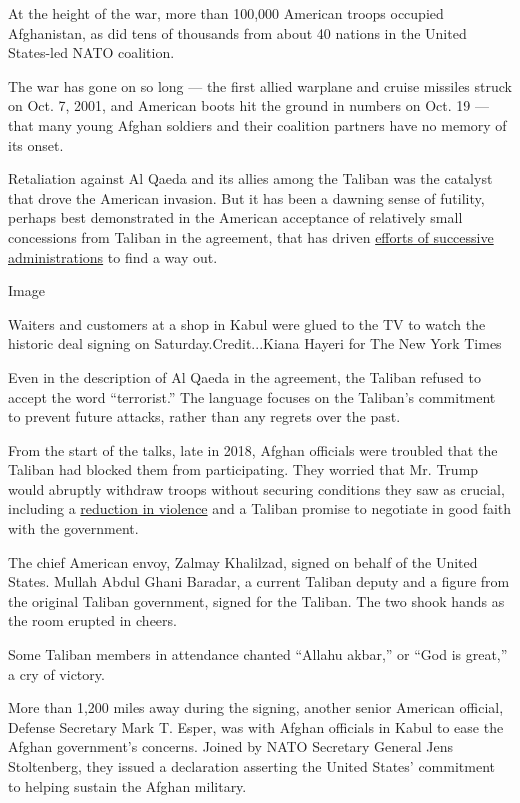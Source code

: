 At the height of the war, more than 100,000 American troops occupied
Afghanistan, as did tens of thousands from about 40 nations in the
United States-led NATO coalition.

The war has gone on so long --- the first allied warplane and cruise
missiles struck on Oct. 7, 2001, and American boots hit the ground in
numbers on Oct. 19 --- that many young Afghan soldiers and their
coalition partners have no memory of its onset.

Retaliation against Al Qaeda and its allies among the Taliban was the
catalyst that drove the American invasion. But it has been a dawning
sense of futility, perhaps best demonstrated in the American acceptance
of relatively small concessions from Taliban in the agreement, that has
driven
\href{https://www.nytimes.com/2020/02/29/world/asia/trump-taliban.html?}{efforts
of successive administrations} to find a way out.

Image

Waiters and customers at a shop in Kabul were glued to the TV to watch
the historic deal signing on Saturday.Credit...Kiana Hayeri for The New
York Times

Even in the description of Al Qaeda in the agreement, the Taliban
refused to accept the word ``terrorist.'' The language focuses on the
Taliban's commitment to prevent future attacks, rather than any regrets
over the past.

From the start of the talks, late in 2018, Afghan officials were
troubled that the Taliban had blocked them from participating. They
worried that Mr. Trump would abruptly withdraw troops without securing
conditions they saw as crucial, including a
\href{https://www.nytimes.com/2020/02/21/world/asia/afghanistan-cease-fire-peace-talks.html}{reduction
in violence} and a Taliban promise to negotiate in good faith with the
government.

The chief American envoy, Zalmay Khalilzad, signed on behalf of the
United States. Mullah Abdul Ghani Baradar, a current Taliban deputy and
a figure from the original Taliban government, signed for the Taliban.
The two shook hands as the room erupted in cheers.

Some Taliban members in attendance chanted ``Allahu akbar,'' or ``God is
great,'' a cry of victory.

More than 1,200 miles away during the signing, another senior American
official, Defense Secretary Mark T. Esper, was with Afghan officials in
Kabul to ease the Afghan government's concerns. Joined by NATO Secretary
General Jens Stoltenberg, they issued a declaration asserting the United
States' commitment to helping sustain the Afghan military.

